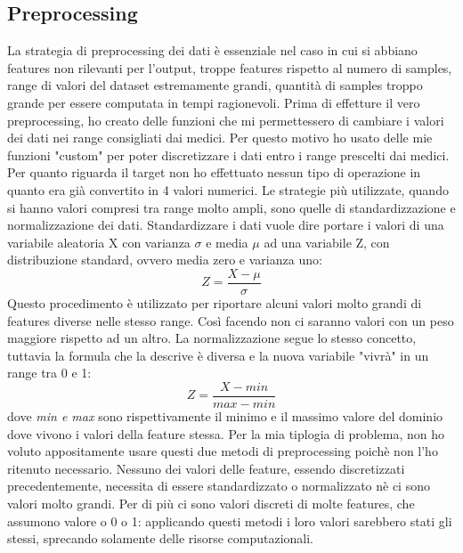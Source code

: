 \subsection{Preprocessing}

La strategia di preprocessing dei dati è essenziale nel caso in cui si abbiano features non rilevanti per l'output, troppe features rispetto al numero di samples, range di valori del dataset estremamente grandi, quantità di samples troppo grande per essere computata in tempi ragionevoli. 
\newline Prima di effetture il vero preprocessing, ho creato delle funzioni che mi permettessero di cambiare i valori dei dati nei range consigliati dai medici. Per questo motivo ho usato delle mie funzioni "custom" per poter discretizzare i dati entro i range prescelti dai medici.
\newline Per quanto riguarda il target non ho effettuato nessun tipo di operazione in quanto era già convertito in 4 valori numerici.
\newline Le strategie più utilizzate, quando si hanno valori compresi tra range molto ampli, sono quelle di standardizzazione e normalizzazione dei dati.
Standardizzare i dati vuole dire portare i valori di una variabile aleatoria X con varianza \begin{math}\sigma\end{math} e media \begin{math}\mu\end{math} ad una variabile Z, con distribuzione standard, ovvero media zero e varianza uno:
\begin{equation}
    Z=\frac{X-\mu}{\sigma}
\end{equation}
Questo procedimento è utilizzato per riportare alcuni valori molto grandi di features diverse nelle stesso range. Così facendo non ci saranno valori con un peso maggiore rispetto ad un altro.
La normalizzazione segue lo stesso concetto, tuttavia la formula che la descrive è diversa e la nuova variabile "vivrà" in un range tra 0 e 1:
\begin{equation}
    Z=\frac{X-min}{max-min}
\end{equation}
dove \textit{min e max} sono rispettivamente il minimo e il massimo valore del dominio dove vivono i valori della feature stessa.
\newline Per la mia tiplogia di problema, non ho voluto appositamente usare questi due metodi di preprocessing poichè non l'ho ritenuto necessario. Nessuno dei valori delle feature, essendo discretizzati precedentemente, necessita di essere standardizzato o normalizzato nè ci sono valori molto grandi. Per di più ci sono valori discreti di molte features, che assumono valore o 0 o 1: applicando questi metodi i loro valori sarebbero stati gli stessi, sprecando solamente delle risorse computazionali. 


